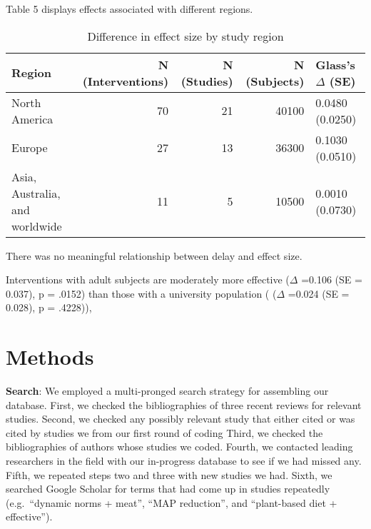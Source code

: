 \documentclass[sn-nature,pdflatex]{sn-jnl}
\begin{document}
Table 5 displays effects associated with different regions.

\begin{table}[!h]
\centering
\caption{\label{tab:table_five}Difference in effect size by study region}
\centering
\begin{tabular}[t]{lrrrl}
\toprule
Region & N (Interventions) & N (Studies) & N (Subjects) & Glass's $\Delta$ (SE)\\
\midrule
North America & 70 & 21 & 40100 & 0.0480 (0.0250)\\
Europe & 27 & 13 & 36300 & 0.1030 (0.0510)\\
Asia, Australia, and worldwide & 11 & 5 & 10500 & 0.0010 (0.0730)\\
\bottomrule
\end{tabular}
\end{table}

There was no meaningful relationship between delay and effect size.

Interventions with adult subjects are moderately more effective
(\(\Delta\) =0.106 (SE = 0.037), p = .0152) than those with a university
population ( (\(\Delta\) =0.024 (SE = 0.028), p = .4228)),

\section{Methods}\label{sec3}

\textbf{Search}: We employed a multi-pronged search strategy for
assembling our database. First, we checked the bibliographies of three
recent reviews
\citep{mathur2021meta, bianchi2018conscious, bianchi2018restructuring}
for relevant studies. Second, we checked any possibly relevant study
that either cited or was cited by studies we from our first round of
coding Third, we checked the bibliographies of authors whose studies we
coded. Fourth, we contacted leading researchers in the field with our
in-progress database to see if we had missed any. Fifth, we repeated
steps two and three with new studies we had. Sixth, we searched Google
Scholar for terms that had come up in studies repeatedly (e.g.~``dynamic
norms + meat'', ``MAP reduction'', and ``plant-based diet +
effective'').

\begin{comment} 
does this need more description? This is not entirely reproducible I think but TBH it was not a major source of studies in our database
\end{comment}
\end{document}
